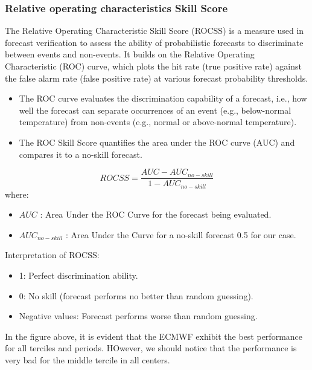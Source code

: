 \subsubsection{Relative operating characteristics Skill Score}
The Relative Operating Characteristic Skill Score (ROCSS) is a measure used in forecast verification to assess the ability of probabilistic forecasts to discriminate between events and non-events. It builds on the Relative Operating Characteristic (ROC) curve, which plots the hit rate (true positive rate) against the false alarm rate (false positive rate) at various forecast probability thresholds.

\begin{itemize}
	\item The ROC curve evaluates the discrimination capability of a forecast, i.e., how well the forecast can separate occurrences of an event (e.g., below-normal temperature) from non-events (e.g., normal or above-normal temperature).
	\item The ROC Skill Score quantifies the area under the ROC curve (AUC) and compares it to a no-skill forecast.
\end{itemize}

	$$ROCSS=\frac{AUC-AUC_{no-skill}}{1-AUC_{no-skill}}$$
where:
\begin{itemize}
	\item $AUC$ : Area Under the ROC Curve for the forecast being evaluated.
	\item $AUC_{no-skill}$ : Area Under the Curve for a no-skill forecast 0.5 for our case.
\end{itemize}

Interpretation of ROCSS:
\begin{itemize}
	\item 1: Perfect discrimination ability.
	\item 0: No skill (forecast performs no better than random guessing).
	\item Negative values: Forecast performs worse than random guessing.
\end{itemize}
	

In the figure above, it is evident that the ECMWF exhibit the best performance for all terciles and periods. HOwever, we should notice that the performance is very bad for the middle tercile in all centers.


